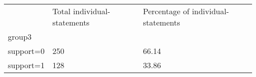 \documentclass{article}
\begin{document}
\begin{table}[!h]
\centering
\begin{tabular}{lll}
\cline{1-3}
\multicolumn{1}{|l}{} &
  \multicolumn{1}{|l}{Total individual-statements} &
  \multicolumn{1}{|l|}{Percentage of individual-statements} \\
\cline{1-3}
\multicolumn{1}{|l}{group3} &
  \multicolumn{1}{|l}{} &
  \multicolumn{1}{|l|}{} \\
\cline{1-3}
\multicolumn{1}{|l}{support=0} &
  \multicolumn{1}{|l}{250} &
  \multicolumn{1}{|l|}{66.14} \\
\cline{1-3}
\multicolumn{1}{|l}{support=1} &
  \multicolumn{1}{|l}{128} &
  \multicolumn{1}{|l|}{33.86} \\
\cline{1-3}
\end{tabular}
\end{table}
\end{document}
